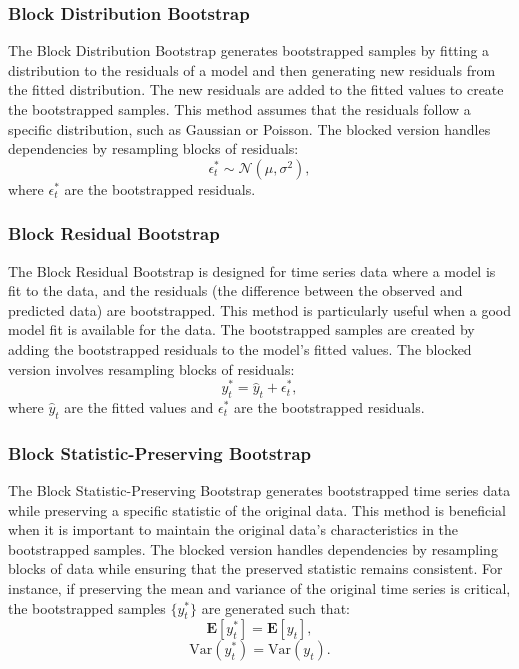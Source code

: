\documentclass{article}
\begin{document}
\subsubsection{Block Distribution Bootstrap}
The Block Distribution Bootstrap generates bootstrapped samples by fitting a distribution to the residuals of a model and then generating new residuals from the fitted distribution. The new residuals are added to the fitted values to create the bootstrapped samples. This method assumes that the residuals follow a specific distribution, such as Gaussian or Poisson. The blocked version handles dependencies by resampling blocks of residuals:
\begin{equation}
    \epsilon_t^* \sim \mathcal{N}(\mu, \sigma^2),
\end{equation}
where \(\epsilon_t^*\) are the bootstrapped residuals.

\subsubsection{Block Residual Bootstrap}
The Block Residual Bootstrap is designed for time series data where a model is fit to the data, and the residuals (the difference between the observed and predicted data) are bootstrapped. This method is particularly useful when a good model fit is available for the data. The bootstrapped samples are created by adding the bootstrapped residuals to the model's fitted values. The blocked version involves resampling blocks of residuals:
\begin{equation}
    y_t^* = \hat{y}_t + \epsilon_t^*,
\end{equation}
where \(\hat{y}_t\) are the fitted values and \(\epsilon_t^*\) are the bootstrapped residuals.

\subsubsection{Block Statistic-Preserving Bootstrap}
The Block Statistic-Preserving Bootstrap generates bootstrapped time series data while preserving a specific statistic of the original data. This method is beneficial when it is important to maintain the original data's characteristics in the bootstrapped samples. The blocked version handles dependencies by resampling blocks of data while ensuring that the preserved statistic remains consistent. For instance, if preserving the mean and variance of the original time series is critical, the bootstrapped samples \( \{ y_t^* \} \) are generated such that:
\begin{equation}
    \mathbf{E}[y_t^*] = \mathbf{E}[y_t],
\end{equation}
\begin{equation}
    \text{Var}(y_t^*) = \text{Var}(y_t).
\end{equation}
\end{document}
